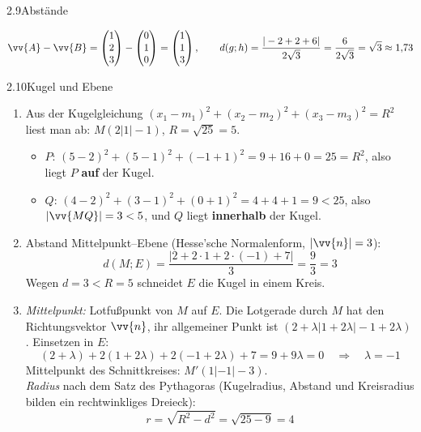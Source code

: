 \begin{loesung}{2.9}{Abstände}
\begin{enumerate}[label=\alph*)]
  \[\vv{A}-\vv{B} = \begin{pmatrix} 1\\ 2\\ 3\end{pmatrix}-\begin{pmatrix} 0\\ 1\\ 0\end{pmatrix} = \begin{pmatrix} 1\\ 1\\ 3\end{pmatrix},\qquad d(g;h) = \dfrac{|-2+2+6|}{2\sqrt{3}} = \dfrac{6}{2\sqrt{3}} = \sqrt{3}\approx 1{,}73\]
\end{enumerate}
\end{loesung}


\begin{loesung}{2.10}{Kugel und Ebene}
\begin{enumerate}[label=\alph*)]
  \item Aus der Kugelgleichung $(x_1-m_1)^2+(x_2-m_2)^2+(x_3-m_3)^2 = R^2$ liest man ab: $M(2|1|-1)$, $R = \sqrt{25} = 5$.
  \begin{itemize}
    \item $P$: $(5-2)^2+(5-1)^2+(-1+1)^2 = 9+16+0 = 25 = R^2$, also liegt $P$ \textbf{auf} der Kugel.
    \item $Q$: $(4-2)^2+(3-1)^2+(0+1)^2 = 4+4+1 = 9 < 25$, also $|\vv{MQ}| = 3 < 5$, und $Q$ liegt \textbf{innerhalb} der Kugel.
  \end{itemize}
  \item Abstand Mittelpunkt--Ebene (Hesse'sche Normalenform, $|\vv{n}|=3$):
  \[d(M;E) = \dfrac{|2+2\cdot 1+2\cdot(-1)+7|}{3} = \dfrac{9}{3} = 3\]
  Wegen $d = 3 < R = 5$ schneidet $E$ die Kugel in einem Kreis.
  \item \textit{Mittelpunkt:} Lotfußpunkt von $M$ auf $E$. Die Lotgerade durch $M$ hat den Richtungsvektor $\vv{n}$, ihr allgemeiner Punkt ist $(2+\lambda|1+2\lambda|-1+2\lambda)$. Einsetzen in $E$:
  \[(2+\lambda)+2(1+2\lambda)+2(-1+2\lambda)+7 = 9+9\lambda = 0\quad\Longrightarrow\quad\lambda = -1\]
  Mittelpunkt des Schnittkreises: $M'(1|-1|-3)$.\\
  \textit{Radius} nach dem Satz des Pythagoras (Kugelradius, Abstand und Kreisradius bilden ein rechtwinkliges Dreieck):
  \[r = \sqrt{R^2-d^2} = \sqrt{25-9} = 4\]
\end{enumerate}
\end{loesung}

